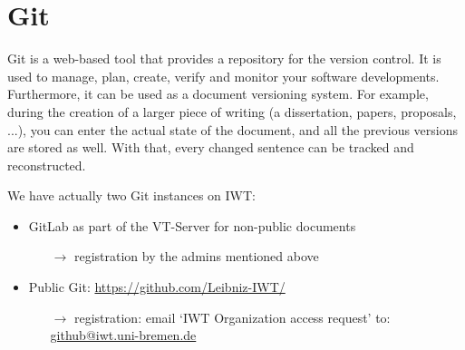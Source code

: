 \section{Git}

Git is a web-based tool that provides a repository for the version control.
It is used to manage, plan, create, verify and monitor your software
developments. Furthermore, it can be used as a document versioning system.
For example, during the creation of a larger piece of writing (a dissertation,
papers, proposals, ...), you can enter the actual state of the document,
and all the previous versions are stored as well. With that, every changed
sentence can be tracked and reconstructed.

We have actually two Git instances on IWT:
\begin{itemize}
  \item GitLab as part of the VT-Server for non-public documents
        \begin{itemize}
          \item[$\rightarrow$] registration by the admins mentioned above
        \end{itemize}
  \item Public Git: \url{https://github.com/Leibniz-IWT/}
        \begin{itemize}
          \item[$\rightarrow$] registration: email `IWT Organization access
                               request' to:
                               \href{mailto:github@iwt.uni-bremen.de}%
                               {github@iwt.uni-bremen.de}
        \end{itemize}
\end{itemize}
